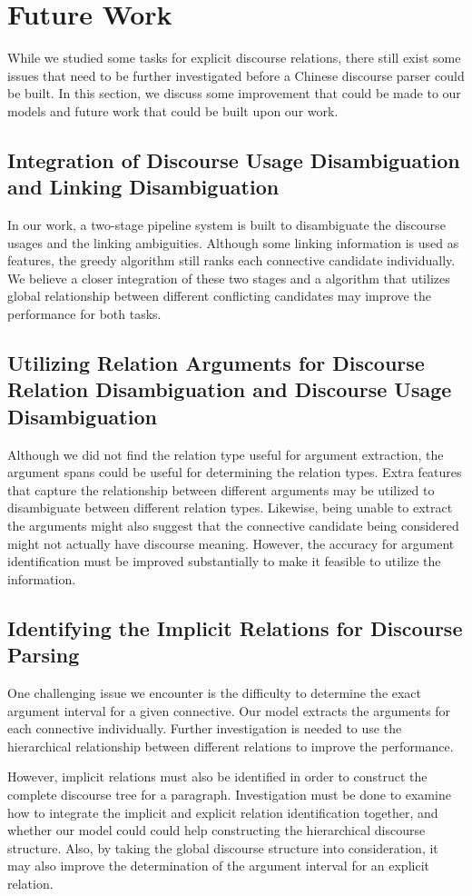 \section{Future Work}

While we studied some tasks for explicit discourse relations,
there still exist some issues that need to be further investigated
before a Chinese discourse parser could be built. In this section,
we discuss some improvement that could be made to our models and
future work that could be built upon our work.

\subsection{Integration of Discourse Usage Disambiguation and Linking Disambiguation}

In our work, a two-stage pipeline system is built to disambiguate
the discourse usages and the linking ambiguities. Although some linking
information is used as features, the greedy algorithm still ranks
each connective candidate individually. We believe a closer integration
of these two stages and a algorithm that utilizes global relationship
between different conflicting candidates may improve the performance
for both tasks.

\subsection{Utilizing Relation Arguments for Discourse Relation Disambiguation
and Discourse Usage Disambiguation}

Although we did not find the relation type useful for
argument extraction, the argument spans could be useful for determining
the relation types.  Extra features that capture the relationship between
different arguments may be utilized to disambiguate between different relation
types. Likewise, being unable to extract the arguments might also suggest
that the connective candidate being considered might not actually have discourse
meaning. However, the accuracy for argument identification must be improved
substantially to make it feasible to utilize the information.

\subsection{Identifying the Implicit Relations for Discourse Parsing}

One challenging issue we encounter is the difficulty to determine
the exact argument interval for a given connective. Our model extracts
the arguments for each connective individually. Further investigation
is needed to use the hierarchical relationship between different
relations to improve the performance.

However, implicit relations must also be identified in order
to construct the complete discourse tree for a paragraph.
Investigation must be done to examine how to integrate the implicit and
explicit relation identification together, and whether our model could
could help constructing the hierarchical discourse structure.
Also, by taking the global discourse structure into
consideration, it may also improve the determination of the argument interval
for an explicit relation.
